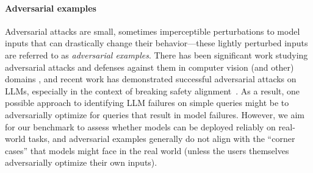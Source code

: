 \paragraph{Adversarial examples}
Adversarial attacks are small, sometimes imperceptible perturbations to model inputs that can drastically change their behavior---these lightly perturbed inputs are referred to as \textit{adversarial examples}. There has been significant work studying adversarial attacks and defenses against them in computer vision (and other) domains \cite{szegedy2014intriguing,carlini2017towards,madry2018towards,papernot16jsma}, and recent work has demonstrated successful adversarial attacks on LLMs, especially in the context of breaking safety alignment~\cite{zou2023universal,xu2023llm}. As a result, one possible approach to identifying LLM failures on simple queries might be to adversarially optimize for queries that result in model failures. However, we aim for our benchmark to assess whether models can be deployed reliably on real-world tasks, and adversarial examples generally do not align with the ``corner cases'' that models might face in the real world (unless the users themselves adversarially optimize their own inputs).

